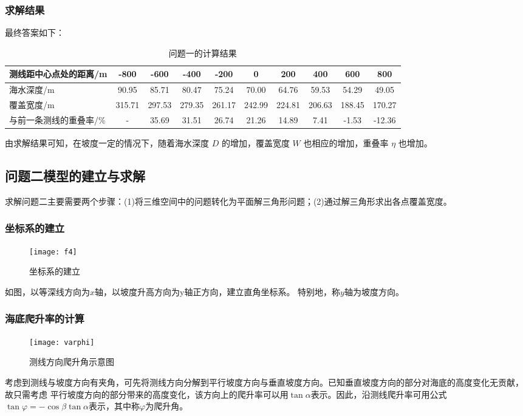 \documentclass[withoutpreface,bwprint]{cumcmthesis} %
\begin{document}
        \subsubsection{求解结果}
        最终答案如下：
        \begin{table}[H]
            \setlength{\tabcolsep}{3.5pt}
            \centering
            \caption{问题一的计算结果}  
            \label{table:1} 
            \begin{tabular}{|m{2.6cm}|c|c|c|c|c|c|c|c|c|}   
            \hline 测线距中心点处的距离/m\centering & -800 & -600 & -400 & -200 & 0 & 200 & 400 & 600 & 800 \\
            \hline 海水深度/m\centering & 90.95 & 85.71 & 80.47 & 75.24 & 70.00 & 64.76 & 59.53 & 54.29 & 49.05 \\
            \hline 覆盖宽度/m\centering & 315.71 & 297.53 & 279.35 & 261.17 & 242.99 & 224.81 & 206.63 & 188.45 & 170.27 \\
            \hline 与前一条测线的重叠率/\%\centering & - & 35.69 & 31.51 & 26.74 & 21.26 & 14.89 & 7.41 & -1.53 & -12.36 \\
            \hline
            \end{tabular}       
        \end{table}

        由求解结果可知，在坡度一定的情况下，随着海水深度 $D$ 的增加，覆盖宽度 $W$ 也相应的增加，重叠率 $\eta$ 也增加。

        \subsection{问题二模型的建立与求解}
        求解问题二主要需要两个步骤：(1)将三维空间中的问题转化为平面解三角形问题；(2)通过解三角形求出各点覆盖宽度。
        \subsubsection{坐标系的建立}
        \begin{figure}[H]
            \centering
            \texttt{[image: f4]}
            \caption{坐标系的建立}
            \label{fig:f4}
        \end{figure}
        如图，以等深线方向为$x$轴，以坡度升高方向为y轴正方向，建立直角坐标系。
        特别地，称$y$轴为坡度方向。

        \subsubsection{海底爬升率的计算}
        \begin{figure}[H]
            \centering
            \texttt{[image: varphi]}
            \caption{测线方向爬升角示意图}
            \label{fig:varphi}
        \end{figure}
        考虑到测线与坡度方向有夹角，可先将测线方向分解到平行坡度方向与垂直坡度方向。已知垂直坡度方向的部分对海底的高度变化无贡献，故只需考虑
        平行坡度方向的部分带来的高度变化，该方向上的爬升率可以用$\tan\alpha $表示。因此，沿测线爬升率可用公式$\tan\varphi = -\cos\beta \tan\alpha $表示，其中称$\varphi$为爬升角。
        
\end{document}
